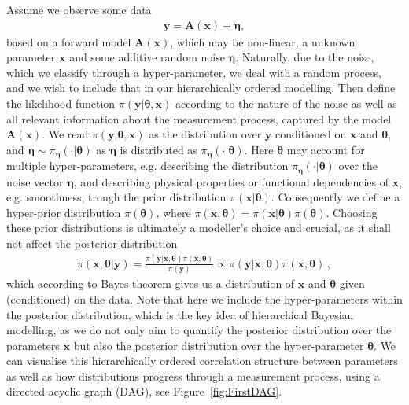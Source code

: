 Assume we observe some data
\begin{align}
	\bm{y} = \bm{A} (\bm{x}) + \bm{\eta},
	\label{eq:LinDat}
\end{align}
based on a forward model $\bm{A}(\bm{x})$, which may be non-linear, a unknown parameter $\bm{x}$ and some additive random noise $\bm{\eta}$.
Naturally, due to the noise, which we classify through a hyper-parameter, we deal with a random process, and we wish to include that in our hierarchically ordered modelling.
Then define the likelihood function $\pi(\bm{y}|\bm{\theta},\bm{x})$ according to the nature of the noise as well as all relevant information about the measurement process, captured by the model $\bm{A}(\bm{x})$.
We read $\pi(\bm{y}|\bm{\theta},\bm{x})$ as the distribution over $\bm{y}$ conditioned on $\bm{x}$ and $\bm{\theta}$, and $\bm{\eta} \sim \pi_{\bm{\eta}}(\cdot|\bm{\theta})$ as $\bm{\eta}$ is distributed as $\pi_{\bm{\eta}}(\cdot|\bm{\theta})$.
Here $\bm{\theta}$ may account for multiple hyper-parameters, e.g. describing the distribution $\pi_{\bm{\eta}}(\cdot|\bm{\theta})$ over the noise vector $\bm{\eta}$, and describing physical properties or functional dependencies of $\bm{x}$, e.g. smoothness, trough the prior distribution $\pi(\bm{x}|\bm{\theta})$.
Consequently we define a hyper-prior distribution $\pi(\bm{\theta})$, where $\pi(\bm{x}, \bm{\theta}) = \pi(\bm{x}|\bm{\theta}) \pi(\bm{\theta}) $.
Choosing these prior distributions is ultimately a modeller's choice and crucial, as it shall not affect the posterior distribution 
\begin{align}
	\pi(\bm{x},\bm{\theta}|\bm{y}) = \frac{ \pi(\bm{y} | \bm{x}, \bm{\theta} ) \pi(\bm{x}, \bm{\theta})}{\pi(\bm{y})} \propto \pi(\bm{y} | \bm{x}, \bm{\theta} ) \pi(\bm{x}, \bm{\theta}) \, ,
\end{align}
which according to Bayes theorem gives us a distribution of $\bm{x}$ and $\bm{\theta}$ given (conditioned) on the data.
Note that here we include the hyper-parameters within the posterior distribution, which is the key idea of hierarchical Bayesian modelling, as we do not only aim to quantify the posterior distribution over the parameters $\bm{x}$ but also the posterior distribution over the hyper-parameter $\bm{\theta}$.
We can visualise this hierarchically ordered correlation structure between parameters as well as how distributions progress through a measurement process, using a directed acyclic graph (DAG), see Figure~\ref{fig:FirstDAG}.

